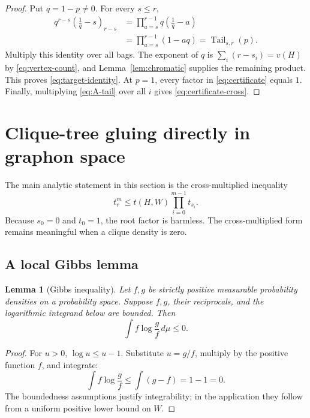 \documentclass[11pt]{article}
\newtheorem{lemma}{Lemma}
\newcommand{\Tail}{\operatorname{Tail}}
\begin{document}
\begin{proof}
Put \(q=1-p\ne0\).  For every \(s\le r\),
\[
\begin{aligned}
    q^{r-s}\left(\frac1q-s\right)_{r-s}
    &=
    \prod_{a=s}^{r-1}q\left(\frac1q-a\right)\\
    &=
    \prod_{a=s}^{r-1}(1-aq)
    =\Tail_{s,r}(p).
\end{aligned}
\]
Multiply this identity over all bags.  The exponent of \(q\) is
\(\sum_i(r-s_i)=v(H)\) by \eqref{eq:vertex-count}, and
Lemma~\ref{lem:chromatic} supplies the remaining product.  This proves
\eqref{eq:target-identity}.  At \(p=1\), every factor in
\eqref{eq:certificate} equals \(1\).  Finally, multiplying
\eqref{eq:A-tail} over all \(i\) gives
\eqref{eq:certificate-cross}.
\end{proof}

\section{Clique-tree gluing directly in graphon space}

The main analytic statement in this section is the cross-multiplied inequality
\begin{equation}\label{eq:gluing-goal}
    t_r^m
    \le
    t(H,W)\prod_{i=0}^{m-1}t_{s_i}.
\end{equation}
Because \(s_0=0\) and \(t_0=1\), the root factor is harmless.  The
cross-multiplied form remains meaningful when a clique density is zero.

\subsection{A local Gibbs lemma}

\begin{lemma}[Gibbs inequality]\label{lem:gibbs}
Let \(f,g\) be strictly positive measurable probability densities on a
probability space.  Suppose \(f,g\), their reciprocals, and the logarithmic
integrand below are bounded.  Then
\[
    \int f\log\frac{g}{f}\,d\mu\le0.
\]
\end{lemma}

\begin{proof}
For \(u>0\), \(\log u\le u-1\).  Substitute \(u=g/f\), multiply by
the positive function \(f\), and integrate:
\[
    \int f\log\frac{g}{f}
    \le
    \int(g-f)
    =1-1=0.
\]
The boundedness assumptions justify integrability; in the application they
follow from a uniform positive lower bound on \(W\).
\end{proof}
\end{document}
